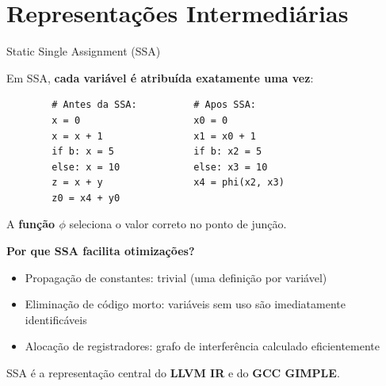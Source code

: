 \section{Representações
Intermediárias}\label{representauxe7uxf5es-intermediuxe1rias}

\begin{frame}[fragile]{Static Single Assignment (SSA)}

    Em SSA, \textbf{cada variável é atribuída exatamente uma vez}:

    \begin{lstlisting}
        # Antes da SSA:          # Apos SSA:
        x = 0                    x0 = 0
        x = x + 1                x1 = x0 + 1
        if b: x = 5              if b: x2 = 5
        else: x = 10             else: x3 = 10
        z = x + y                x4 = phi(x2, x3)
        z0 = x4 + y0
    \end{lstlisting}

    A \textbf{função \(\phi\)} seleciona o valor correto no ponto de junção.

    \textbf{Por que SSA facilita otimizações?}

    \begin{itemize}

        \item
        Propagação de constantes: trivial (uma definição por variável)
        \item
        Eliminação de código morto: variáveis sem uso são imediatamente
        identificáveis
        \item
        Alocação de registradores: grafo de interferência calculado
        eficientemente
    \end{itemize}

    SSA é a representação central do \textbf{LLVM IR} e do \textbf{GCC
    GIMPLE}.
\end{frame}

